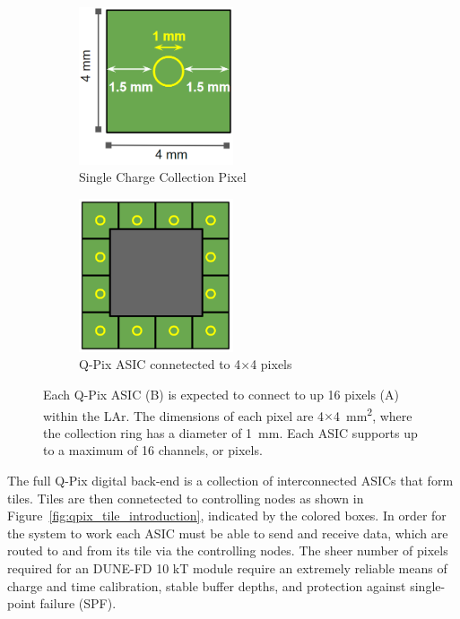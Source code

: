 \begin{figure}
\centering
\begin{subfigure}{.5\textwidth}
  \centering
  \includegraphics[width=0.5\textwidth]{images/single_pixel_dimensions_qpix.png}
  \caption{Single Charge Collection Pixel}
\end{subfigure}%
\begin{subfigure}{.5\textwidth}
  \centering
  \includegraphics[width=0.5\textwidth]{images/single_asic_dimensions_qpix.png}
  \caption{Q-Pix ASIC connetected to 4$\times$4 pixels}
\end{subfigure}
\caption{Each Q-Pix ASIC (B) is expected to connect to up 16 pixels (A) within the LAr.
The dimensions of each pixel are 4$\times$4~\unit{mm^2}, where the collection ring has a diameter of 1~\unit{mm}.
Each ASIC supports up to a maximum of 16 channels, or pixels.
}
\label{fig:qpix_asic_introduction}
\end{figure}

The full Q-Pix digital back-end is a collection of interconnected ASICs that form tiles.
Tiles are then connetected to controlling nodes as shown in Figure~\ref{fig:qpix_tile_introduction}, indicated by the colored boxes.
In order for the system to work each ASIC must be able to send and receive data, which are routed to and from its tile via the controlling nodes.
The sheer number of pixels required for an DUNE-FD 10 kT module require an extremely reliable means of charge and time calibration, stable buffer depths, and protection against single-point failure (SPF).

